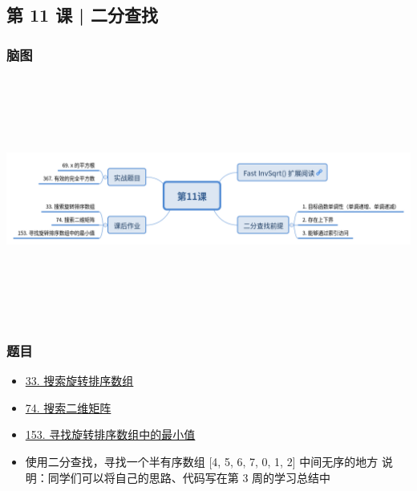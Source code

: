 \subsection{第 11 课 | 二分查找}

\subsubsection{脑图}

\includegraphics[width=170mm,height=80mm]{images/第11课.png}

\subsubsection{题目}

\begin{itemize}
  \item \hyperref[leetcode:33]{33. 搜索旋转排序数组}
  \item \hyperref[leetcode:74]{74. 搜索二维矩阵}
  \item \hyperref[leetcode:153]{153. 寻找旋转排序数组中的最小值}
  \item 使用二分查找，寻找一个半有序数组 [4, 5, 6, 7, 0, 1, 2] 中间无序的地方
    说明：同学们可以将自己的思路、代码写在第 3 周的学习总结中
\end{itemize}
